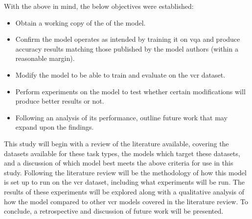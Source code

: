 
With the above in mind, the below objectives were established:

\begin{itemize}\label{list:list_of_objectives}
    \item Obtain a working copy of the of the model.
    \item Confirm the model operates as intended by training it on \gls{vqa} and produce accuracy results matching those published by the model authors (within a reasonable margin).
    \item Modify the model to be able to train and evaluate on the \gls{vcr} dataset.
    \item Perform experiments on the model to test whether certain modifications will produce better results or not.
    \item Following an analysis of its performance, outline future work that may expand upon the findings.
\end{itemize}

This study will begin with a review of the literature available, covering the datasets available for these task types, the models which target these datasets, and a discussion of which model best meets the above criteria for use in this study.
Following the literature review will be the methodology of how this model is set up to run on the \gls{vcr} dataset, including what experiments will be run.
The results of these experiments will be explored along with a qualitative analysis of how the model compared to other \gls{vcr} models covered in the literature review.
To conclude, a retrospective and discussion of future work will be presented.
